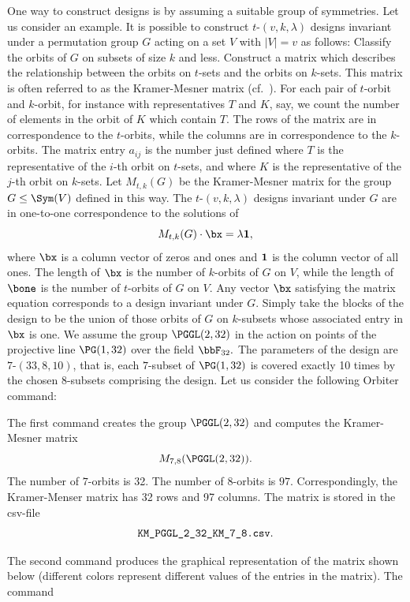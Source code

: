 One way to construct designs is by assuming a suitable group of symmetries. 
Let us consider an example. 
It is possible to construct $t$-$(v,k,\lambda)$ designs invariant under a permutation group $G$ 
acting on a set $V$ with $|V| = v$ as follows: 
Classify the orbits of $G$ on subsets of size $k$ and less. 
Construct a matrix which describes the relationship between 
the orbits on $t$-sets and the orbits on $k$-sets. 
This matrix is often referred to as the Kramer-Mesner matrix (cf.~\cite{KramerMesner76}).
For each pair of $t$-orbit and $k$-orbit, 
for instance with representatives $T$ and $K$, say, 
we count the number of elements in the orbit of $K$ which contain $T$. 
The rows of the matrix are in correspondence to the $t$-orbits, 
while the columns are in correspondence to the $k$-orbits. 
The matrix entry $a_{ij}$ is the number just defined where $T$ is the representative of the 
$i$-th orbit on $t$-sets, 
and where $K$ is the representative of the $j$-th orbit on $k$-sets. 
Let $M_{t,k}(G)$ be the Kramer-Mesner matrix 
for the group $G \le \Sym(V)$ defined in this way. 
The 
$t$-$(v,k,\lambda)$ designs invariant under $G$ 
are in one-to-one correspondence to the solutions of 
$$
M_{t,k}(G)\cdot \bx = \lambda {\bf 1},
$$
where $\bx$ is a column vector of zeros and ones 
and ${\bf 1}$ is the column vector of all ones.
The length of $\bx$ is the number of $k$-orbits of $G$ on $V$, 
while the length of $\bone$ is the number of $t$-orbits of $G$ on $V$. 
Any vector $\bx$ satisfying the matrix equation 
corresponds to a design invariant under $G$.
Simply take the  blocks of the design to be the union 
of those orbits of $G$ on $k$-subsets 
whose associated entry in $\bx$ is one.
We assume the group $\PGGL(2,32)$ in the action on points 
of the projective line $\PG(1,32)$ 
over the field $\bbF_{32}.$
The parameters of the design are $7$-$(33,8,10)$, 
that is, each $7$-subset of $\PG(1,32)$
is covered exactly 10 times by the chosen $8$-subsets comprising the design.
Let us consider the following Orbiter command:


The first command creates the group $\PGGL(2,32)$ 
and computes the Kramer-Mesner matrix 
$$
M_{7,8}(\PGGL(2,32)).
$$
The number of $7$-orbits is 32. The number of $8$-orbits is $97.$
Correspondingly, the Kramer-Menser matrix has 32 rows and 97 columns.
The matrix is stored in the csv-file 
$$
\verb'KM_PGGL_2_32_KM_7_8.csv'.
$$

The second command produces the graphical representation 
of the matrix shown below
(different colors represent different values of the entries in the matrix).
The command

